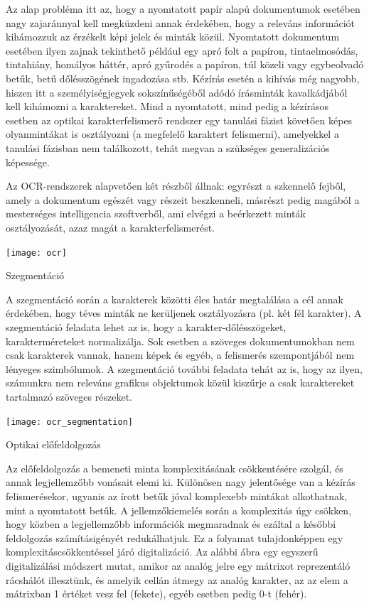Az alap probléma itt az, hogy a nyomtatott papír alapú dokumentumok esetében nagy zajaránnyal kell megküzdeni annak érdekében, hogy a releváns információt kihámozzuk az érzékelt képi jelek és minták közül. Nyomtatott dokumentum esetében ilyen zajnak tekinthető például egy apró folt a papíron, tintaelmosódás, tintahiány, homályos háttér, apró gyűrodés a papíron, túl közeli vagy egybeolvadó betűk, betű dőlésszögének ingadozása stb. Kézírás esetén a kihívás még nagyobb, hiszen itt a személyiségjegyek sokszínűségéből adódó írásminták kavalkádjából kell kihámozni a karaktereket. Mind a nyomtatott, mind pedig a kézírásos esetben az optikai karakterfelismerő rendszer egy tanulási fázist követően képes olyanmintákat is osztályozni (a megfelelő karaktert felismerni), amelyekkel a tanulási fázisban nem találkozott, tehát megvan a szükséges generalizációs képessége.

Az OCR-rendszerek alapvetően két részből állnak: egyrészt a szkennelő fejből, amely a dokumentum egészét vagy részeit beszkenneli, másrészt pedig magából a mesterséges intelligencia szoftverből, ami elvégzi a beérkezett minták osztályozását, azaz magát a karakterfelismerést.

\begin{center}
\texttt{[image: ocr]}
\end{center}

Szegmentáció

A szegmentáció során a karakterek közötti éles határ megtalálása a cél annak érdekében, hogy téves minták ne kerüljenek osztályozásra (pl. két fél karakter). A szegmentáció feladata lehet az is, hogy a karakter-dőlésszögeket, karakterméreteket normalizálja. Sok esetben a szöveges dokumentumokban nem csak karakterek vannak, hanem képek és egyéb, a felismerés szempontjából nem lényeges szimbólumok. A szegmentáció további feladata tehát az is, hogy az ilyen, számunkra nem releváns grafikus objektumok közül kiszűrje a csak karaktereket tartalmazó szöveges részeket.

\begin{center}
\texttt{[image: ocr\_segmentation]}
\end{center}

Optikai előfeldolgozás

Az előfeldolgozás a bemeneti minta komplexitásának csökkentésére szolgál, és annak legjellemzőbb vonásait elemi ki. Különösen nagy jelentősége van a kézírás felismerésekor, ugyanis az írott betűk jóval komplexebb mintákat alkothatnak, mint a nyomtatott betűk. A jellemzőkiemelés során a komplexitás úgy csökken, hogy közben a legjellemzőbb információk megmaradnak és ezáltal a későbbi feldolgozás számításigényét redukálhatjuk. Ez a folyamat tulajdonképpen egy komplexitáscsökkentéssel járó digitalizáció. Az alábbi ábra egy egyszerű digitalizálási módszert mutat, amikor az analóg jelre egy mátrixot reprezentáló rácshálót illesztünk, és amelyik cellán átmegy az analóg karakter, az az elem a mátrixban 1 értéket vesz fel (fekete), egyéb esetben pedig 0-t (fehér).

